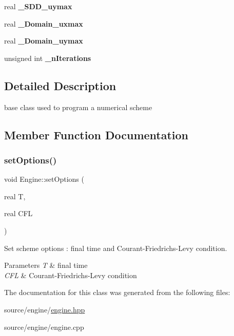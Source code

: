 \begin{DoxyCompactItemize}
\mbox{\label{classEngine_a9e1542346fb28c0a2cb9ea02640f1f94}} 
real {\bfseries \+\_\+\+S\+D\+D\+\_\+uymax}
\item 
\mbox{\label{classEngine_a4286013e363e097cae5a7f4df4b86b56}} 
real {\bfseries \+\_\+\+Domain\+\_\+uxmax}
\item 
\mbox{\label{classEngine_ad9b42c6947ad96fecb3e1e6102471f17}} 
real {\bfseries \+\_\+\+Domain\+\_\+uymax}
\item 
\mbox{\label{classEngine_a419970715d830fa99907c4f195863297}} 
unsigned int {\bfseries \+\_\+n\+Iterations}
\end{DoxyCompactItemize}


\subsection{Detailed Description}
base class used to program a numerical scheme 

\subsection{Member Function Documentation}
\mbox{\label{classEngine_a6837cf148e122390a924718435cea117}} 
\subsubsection{\texorpdfstring{set\+Options()}{setOptions()}}
{\footnotesize\ttfamily void Engine\+::set\+Options (\begin{DoxyParamCaption}\item[{real}]{T,  }\item[{real}]{C\+FL }\end{DoxyParamCaption})}



Set scheme options \+: final time and Courant-\/\+Friedrichs-\/\+Levy condition. 


\begin{DoxyParams}{Parameters}
{\em T} & final time \\
\hline
{\em C\+FL} & Courant-\/\+Friedrichs-\/\+Levy condition \\
\hline
\end{DoxyParams}


The documentation for this class was generated from the following files\+:\begin{DoxyCompactItemize}
\item 
source/engine/\mbox{\hyperlink{engine_8hpp}{engine.\+hpp}}\item 
source/engine/engine.\+cpp\end{DoxyCompactItemize}
